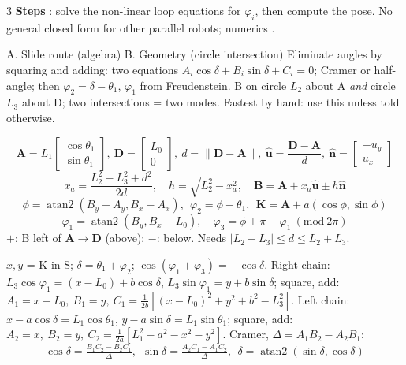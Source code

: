 \begin{multicols}{3}
\textbf{Steps} : solve the non-linear loop equations for $\varphi_i$, then compute the pose. No general closed form for other parallel robots; numerics .
\begin{twoway}{A. Slide route (algebra) }{B. Geometry (circle intersection) \added}
Eliminate angles by squaring and adding: two equations $A_i\cos\delta+B_i\sin\delta+C_i=0$; Cramer or half-angle; then $\varphi_2=\delta-\theta_1$, $\varphi_1$ from Freudenstein.
\tcblower
B on circle $L_2$ about A \emph{and} circle $L_3$ about D; two intersections = two modes. Fastest by hand: use this unless told otherwise.
\end{twoway}
\begin{fbx}
\[\mathbf A=L_1\begin{bmatrix}\cos\theta_1\\\sin\theta_1\end{bmatrix},\ \mathbf D=\begin{bmatrix}L_0\\0\end{bmatrix},\ d=\lVert\mathbf D-\mathbf A\rVert,\ \hat{\mathbf u}=\frac{\mathbf D-\mathbf A}{d},\ \hat{\mathbf n}=\begin{bmatrix}-u_y\\u_x\end{bmatrix}\]
\[x_a=\frac{L_2^2-L_3^2+d^2}{2d},\quad h=\sqrt{L_2^2-x_a^2},\quad\mathbf B=\mathbf A+x_a\hat{\mathbf u}\pm h\hat{\mathbf n}\]
\[\phi=\operatorname{atan2}(B_y-A_y,B_x-A_x),\ \ \varphi_2=\phi-\theta_1,\ \ \mathbf K=\mathbf A+a(\cos\phi,\sin\phi)\]
\[\varphi_1=\operatorname{atan2}(B_y,B_x-L_0),\quad\varphi_3=\phi+\pi-\varphi_1\ (\mathrm{mod}\ 2\pi)\]
$+$: B left of $\mathbf A\!\to\!\mathbf D$ (above); $-$: below. Needs $\lvert L_2-L_3\rvert\le d\le L_2+L_3$.
\end{fbx}
\begin{deriv}
$x,y$ = K in {S}; $\delta=\theta_1+\varphi_2$; $\cos(\varphi_1+\varphi_3)=-\cos\delta$. Right chain: $L_3\cos\varphi_1=(x-L_0)+b\cos\delta$, $L_3\sin\varphi_1=y+b\sin\delta$; square, add:
$A_1=x-L_0,\ B_1=y,\ C_1=\frac1{2b}[(x-L_0)^2+y^2+b^2-L_3^2]$.
Left chain: $x-a\cos\delta=L_1\cos\theta_1$, $y-a\sin\delta=L_1\sin\theta_1$; square, add:
$A_2=x,\ B_2=y,\ C_2=\frac1{2a}[L_1^2-a^2-x^2-y^2]$.
Cramer, $\Delta=A_1B_2-A_2B_1$:
\[\cos\delta=\tfrac{B_1C_2-B_2C_1}{\Delta},\ \ \sin\delta=\tfrac{A_2C_1-A_1C_2}{\Delta},\ \ \delta=\operatorname{atan2}(\sin\delta,\cos\delta)\]

\end{deriv}
\end{multicols}
